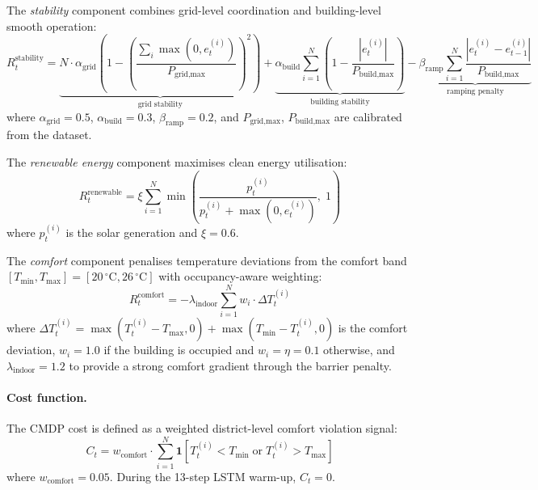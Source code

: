 The \emph{stability} component combines grid-level coordination and
building-level smooth operation:
\begin{equation}
  R_t^{\text{stability}} = \underbrace{N \cdot \alpha_{\text{grid}} \left(
    1 - \left(\frac{\sum_i \max(0, e_t^{(i)})}{P_{\text{grid,max}}}\right)^2
  \right)}_{\text{grid stability}}
  + \underbrace{\alpha_{\text{build}} \sum_{i=1}^{N} \left(
    1 - \frac{|e_t^{(i)}|}{P_{\text{build,max}}}
  \right)}_{\text{building stability}}
  - \underbrace{\beta_{\text{ramp}} \sum_{i=1}^{N} \frac{|e_t^{(i)} - e_{t-1}^{(i)}|}{P_{\text{build,max}}}}_{\text{ramping penalty}}
  \label{eq:reward-stability}
\end{equation}
where $\alpha_{\text{grid}} = 0.5$, $\alpha_{\text{build}} = 0.3$,
$\beta_{\text{ramp}} = 0.2$, and $P_{\text{grid,max}}$, $P_{\text{build,max}}$
are calibrated from the dataset.

The \emph{renewable energy} component maximises clean energy utilisation:
\begin{equation}
  R_t^{\text{renewable}} = \xi \sum_{i=1}^{N}
    \min\!\left(\frac{p_t^{(i)}}{p_t^{(i)} + \max(0, e_t^{(i)})},\; 1\right)
  \label{eq:reward-renewable}
\end{equation}
where $p_t^{(i)}$ is the solar generation and $\xi = 0.6$.

The \emph{comfort} component penalises temperature deviations from the comfort
band $[T_{\min}, T_{\max}] = [20\,^\circ\text{C}, 26\,^\circ\text{C}]$ with
occupancy-aware weighting:
\begin{equation}
  R_t^{\text{comfort}} = -\lambda_{\text{indoor}} \sum_{i=1}^{N}
    w_i \cdot \Delta T_t^{(i)}
  \label{eq:reward-comfort}
\end{equation}
where $\Delta T_t^{(i)} = \max(T_t^{(i)} - T_{\max}, 0) + \max(T_{\min} -
T_t^{(i)}, 0)$ is the comfort deviation, $w_i = 1.0$ if the building is
occupied and $w_i = \eta = 0.1$ otherwise, and $\lambda_{\text{indoor}} = 1.2$
to provide a strong comfort gradient through the barrier penalty.

\paragraph{Cost function.}
The CMDP cost is defined as a weighted district-level comfort violation signal:
\begin{equation}
  C_t = w_{\text{comfort}} \cdot \sum_{i=1}^{N} \mathbf{1}\!\left[
    T_t^{(i)} < T_{\min} \;\text{or}\; T_t^{(i)} > T_{\max}
  \right]
  \label{eq:cmdp-cost}
\end{equation}
where $w_{\text{comfort}} = 0.05$.  During the 13-step LSTM warm-up,
$C_t = 0$.

